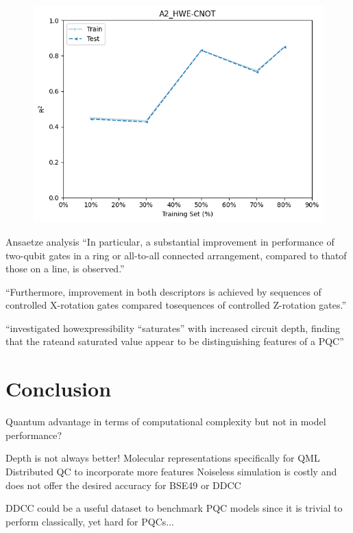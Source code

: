 \documentclass[journal=jacsat,manuscript=article]{achemso}
\begin{document}
\begin{figure}[H]
	\centering
	\includegraphics[width=\linewidth]{../images/DDCC/DDCC_learning_curves}
	\caption{}
	\label{fig:ddcclearningcurves}
\end{figure}

Ansaetze analysis \cite{sim_expressibility_2019}
``In particular, a substantial improvement in performance of two-qubit gates in a ring or all-to-all connected arrangement, compared to thatof those on a line, is observed.''

``Furthermore, improvement in both descriptors is achieved by sequences of controlled X-rotation gates compared tosequences of controlled Z-rotation gates.''

``investigated howexpressibility “saturates” with increased circuit depth, finding that the rateand saturated value appear to be distinguishing features of a PQC''



\section{Conclusion}
Quantum advantage in terms of computational complexity but not in model performance?


Depth is not always better!
Molecular representations specifically for QML
Distributed QC to incorporate more features
Noiseless simulation is costly and does not offer the desired accuracy for BSE49 or DDCC

DDCC could be a useful dataset to benchmark PQC models since it is trivial to perform classically, yet hard for PQCs...


\end{document}
